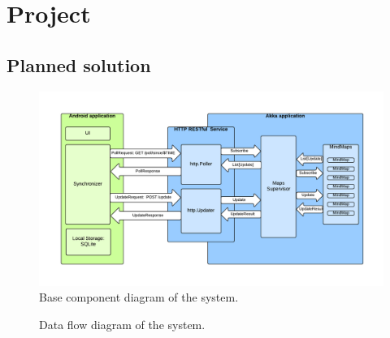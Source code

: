 %
%
%
%
%

\chapter{Project}
\label{chap:project}



\section{Planned solution}
\label{sec:plan}

\begin{figure}[h]
	\centering
	\includegraphics[width=\textwidth]{component-diagram}
	\caption{Base component diagram of the system.}
	\label{fig:diagram-components-system}
\end{figure}

\begin{figure}[h]
	\centering
	\caption{Data flow diagram of the system.}
	\label{fig:diagram-dfd}
\end{figure}

